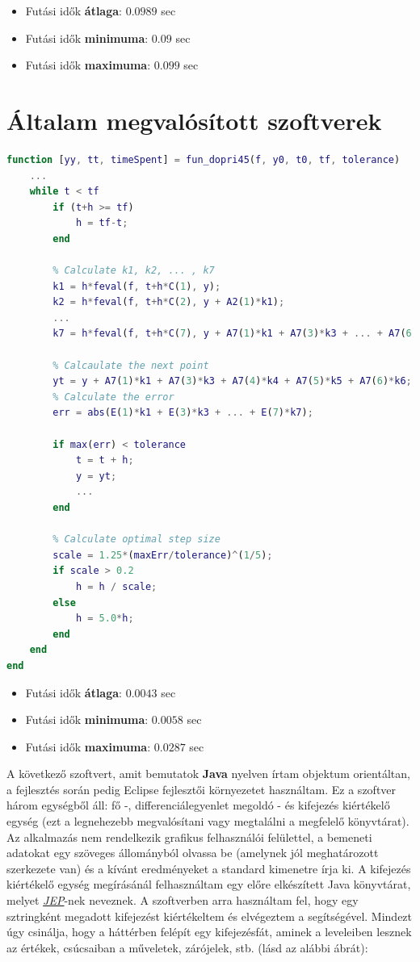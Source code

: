 \begin{itemize}
	\item Futási idők \textbf{átlaga}: $ 0.0989 $ sec
	\item Futási idők \textbf{minimuma}: $ 0.09 $ sec
	\item Futási idők \textbf{maximuma}: $ 0.099 $ sec
\end{itemize}

\section {Általam megvalósított szoftverek} \label{fejezet3_2}

\begin{lstlisting}[caption={Matlab kód ode45 használata nélkül.}, captionpos=b, language = Matlab]
function [yy, tt, timeSpent] = fun_dopri45(f, y0, t0, tf, tolerance)
	...
	while t < tf
		if (t+h >= tf)
			h = tf-t;
		end
		
		% Calculate k1, k2, ... , k7
		k1 = h*feval(f, t+h*C(1), y);
		k2 = h*feval(f, t+h*C(2), y + A2(1)*k1);
		...
		k7 = h*feval(f, t+h*C(7), y + A7(1)*k1 + A7(3)*k3 + ... + A7(6)*k6);
		
		% Calcaulate the next point
		yt = y + A7(1)*k1 + A7(3)*k3 + A7(4)*k4 + A7(5)*k5 + A7(6)*k6;
		% Calculate the error
		err = abs(E(1)*k1 + E(3)*k3 + ... + E(7)*k7);
		
		if max(err) < tolerance
			t = t + h;
			y = yt;
			...
		end
		
		% Calculate optimal step size
		scale = 1.25*(maxErr/tolerance)^(1/5);
		if scale > 0.2
			h = h / scale;
		else
			h = 5.0*h;
		end
	end
end
\end{lstlisting}

\begin{itemize}
	\item Futási idők \textbf{átlaga}: $ 0.0043 $ sec
	\item Futási idők \textbf{minimuma}: $ 0.0058 $ sec
	\item Futási idők \textbf{maximuma}: $ 0.0287 $ sec
\end{itemize}

A következő szoftvert, amit bemutatok \textbf{Java} nyelven írtam objektum orientáltan, a fejlesztés során pedig Eclipse fejlesztői környezetet használtam. Ez a szoftver három egységből áll: fő -, differenciálegyenlet megoldó - és kifejezés kiértékelő egység (ezt a legnehezebb megvalósítani vagy megtalálni a megfelelő könyvtárat). Az alkalmazás nem rendelkezik grafikus felhasználói felülettel, a bemeneti adatokat egy szöveges állományból olvassa be (amelynek jól meghatározott szerkezete van) és a kívánt eredményeket a standard kimenetre írja ki. A kifejezés kiértékelő egység megírásánál felhasználtam egy előre elkészített Java könyvtárat, melyet \href{http://www.singularsys.com/jep/}{\textit{JEP}}-nek neveznek. A szoftverben arra használtam fel, hogy egy sztringként megadott kifejezést kiértékeltem és elvégeztem a segítségével. Mindezt úgy csinálja, hogy a háttérben felépít egy kifejezésfát, aminek a leveleiben lesznek az értékek, csúcsaiban a műveletek, zárójelek, stb. (lásd az alábbi ábrát):



